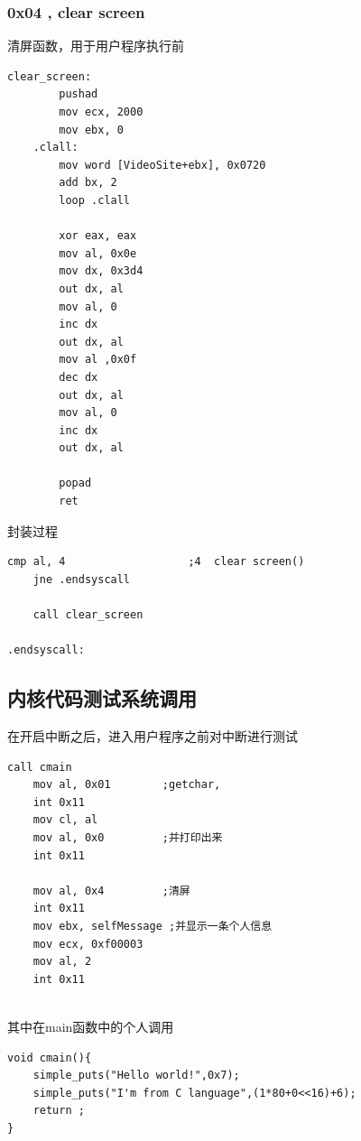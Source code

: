 \documentclass[a4paper,11pt,UTF8]{ctexart}
\begin{document}
		\subsubsection{0x04 , clear screen}
		清屏函数，用于用户程序执行前
			\begin{lstlisting}[language=={[x86masm]Assembler}keywordstyle=\color{blue!70},commentstyle=\color{red!50!green!50!blue!50},frame=shadowbox, rulesepcolor=\color{red!20!green!20!blue!20}]
clear_screen:
		pushad
		mov ecx, 2000
		mov ebx, 0
	.clall:
		mov word [VideoSite+ebx], 0x0720
		add bx, 2
		loop .clall

		xor eax, eax
		mov al, 0x0e
		mov dx, 0x3d4
		out dx, al
		mov al, 0
		inc dx
		out dx, al
		mov al ,0x0f
		dec dx
		out dx, al
		mov al, 0
		inc dx
		out dx, al

		popad
		ret
			\end{lstlisting}
		封装过程
			\begin{lstlisting}[language={[ANSI]C},keywordstyle=\color{blue!70},commentstyle=\color{red!50!green!50!blue!50},frame=shadowbox, rulesepcolor=\color{red!20!green!20!blue!20}]
	cmp al, 4					;4	clear screen()
	jne	.endsyscall

	call clear_screen

.endsyscall:
			\end{lstlisting} 
			
	\subsection{内核代码测试系统调用}
			在开启中断之后，进入用户程序之前对中断进行测试
			\begin{lstlisting}[language=={[x86masm]Assembler}keywordstyle=\color{blue!70},commentstyle=\color{red!50!green!50!blue!50},frame=shadowbox, rulesepcolor=\color{red!20!green!20!blue!20}]
	call cmain
	mov al, 0x01		;getchar,
	int 0x11
	mov cl, al
	mov al, 0x0			;并打印出来
	int 0x11

	mov al, 0x4  		;清屏
	int 0x11
	mov ebx, selfMessage ;并显示一条个人信息
	mov ecx, 0xf00003
	mov al, 2
	int 0x11
	
			\end{lstlisting}
			其中在main函数中的个人调用
			\begin{lstlisting}[language={[ANSI]C},keywordstyle=\color{blue!70},commentstyle=\color{red!50!green!50!blue!50},frame=shadowbox, rulesepcolor=\color{red!20!green!20!blue!20}]
void cmain(){
	simple_puts("Hello world!",0x7);
	simple_puts("I'm from C language",(1*80+0<<16)+6);
	return ;
}
				
			\end{lstlisting} 
\end{document}
